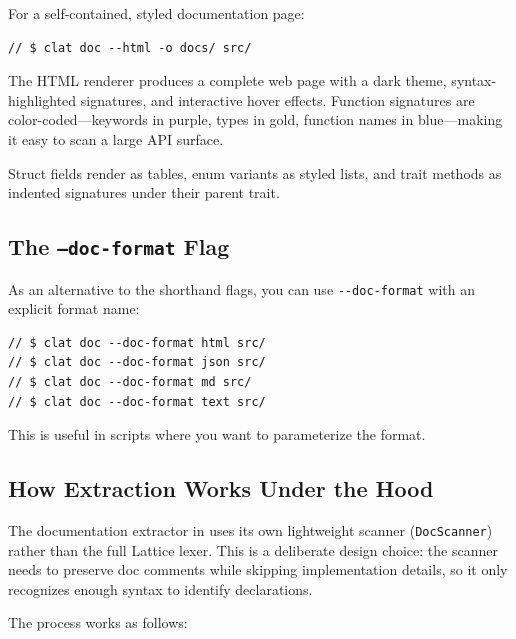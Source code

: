For a self-contained, styled documentation page:

\begin{lstlisting}[language=Lattice, caption={Generating HTML documentation}]
// $ clat doc --html -o docs/ src/
\end{lstlisting}

The HTML renderer produces a complete web page with a dark theme, syntax-highlighted signatures, and interactive hover effects.
Function signatures are color-coded---keywords in purple, types in gold, function names in blue---making it easy to scan a large API surface.

Struct fields render as tables, enum variants as styled lists, and trait methods as indented signatures under their parent trait.

\subsection{The \texttt{--doc-format} Flag}\label{sec:doc-format-flag}

As an alternative to the shorthand flags, you can use \lstinline|--doc-format| with an explicit format name:

\begin{lstlisting}[language=Lattice, caption={Using {-}{-}doc-format}]
// $ clat doc --doc-format html src/
// $ clat doc --doc-format json src/
// $ clat doc --doc-format md src/
// $ clat doc --doc-format text src/
\end{lstlisting}

This is useful in scripts where you want to parameterize the format.

\subsection{How Extraction Works Under the Hood}\label{sec:doc-extraction-internals}

The documentation extractor in  uses its own lightweight scanner (\lstinline|DocScanner|) rather than the full Lattice lexer.
This is a deliberate design choice: the scanner needs to preserve doc comments while skipping implementation details, so it only recognizes enough syntax to identify declarations.

The process works as follows:

